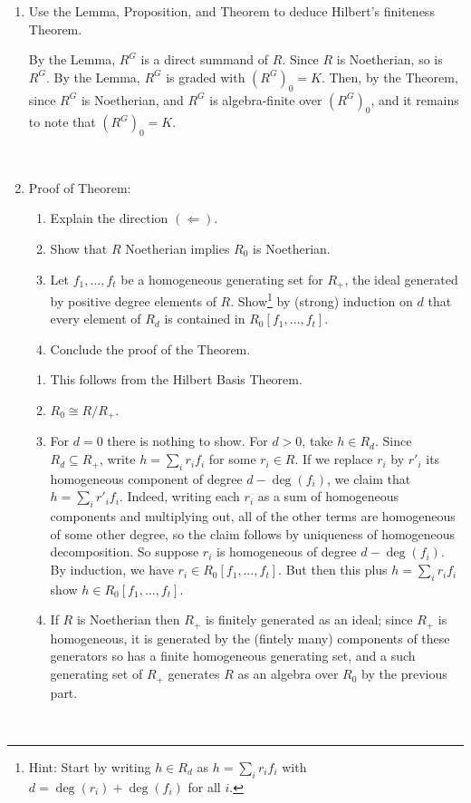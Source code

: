 \documentclass[12pt]{amsart}
\newcommand{\1}{\mathbbm{1}}
\newcommand{\solution}[1]{\ifthenelse {\equal{\displaysol}{1}} {\begin{framed}{\color{meretale}\noindent #1}\end{framed}} { \ }}
\newcommand\itemA{\stepcounter{enumi}\item[{\bf{(\theenumi)}}]}
\begin{document}
 
\begin{enumerate}
\itemA Use the Lemma, Proposition, and Theorem to deduce Hilbert's finiteness Theorem.

\solution{By the Lemma, $R^G$ is a direct summand of $R$. Since $R$ is Noetherian, so is $R^G$. By the Lemma, $R^G$ is graded with $(R^G)_0=K$. Then, by the Theorem, since $R^G$ is Noetherian, and $R^G$ is algebra-finite over $(R^G)_0$, and it remains to note that $(R^G)_0=K$.}

\itemA Proof of Theorem:
\begin{enumerate}
\item Explain the direction $(\Leftarrow)$.
\item Show that $R$ Noetherian implies $R_0$ is Noetherian.
\item Let $f_1,\dots,f_t$ be a homogeneous generating set for $R_+$, the ideal generated by positive degree elements of $R$. Show\footnote{Hint: Start by writing $h\in R_d$ as $h=\sum_i r_i f_i$ with $d = \deg(r_i) +\deg(f_i)$ for all $i$.} by (strong) induction on $d$ that every element of $R_d$ is contained in $R_0[f_1,\dots,f_t]$.
\item Conclude the proof of the Theorem.
\end{enumerate}


\solution{\begin{enumerate}
\item This follows from the Hilbert Basis Theorem.
\item $R_0\cong R/R_+$.
\item For $d=0$ there is nothing to show. For $d>0$, take $h\in R_d$. Since $R_d\subseteq R_+$, write $h=\sum_i r_i f_i$ for some $r_i\in R$. If we replace $r_i$ by $r'_i$ its homogeneous component of degree $d-\deg(f_i)$, we claim that $h=\sum_i r'_i f_i$. Indeed, writing each $r_i$ as a sum of homogeneous components and multiplying out, all of the other terms are homogeneous of some other degree, so the claim follows by uniqueness of homogeneous decomposition. So suppose $r_i$ is homogeneous of degree $d-\deg(f_i)$. By induction, we have $r_i\in R_0[f_1,\dots,f_t]$. But then this plus $h=\sum_i r_i f_i$ show $h\in R_0[f_1,\dots,f_t]$.
\item If $R$ is Noetherian then $R_+$ is finitely generated as an ideal; since $R_+$ is homogeneous, it is generated by the (fintely many) components of these generators so has a finite homogeneous generating set, and a such generating set of $R_+$ generates $R$ as an algebra over $R_0$ by the previous part.
\end{enumerate}}


\end{enumerate}
\end{document}
